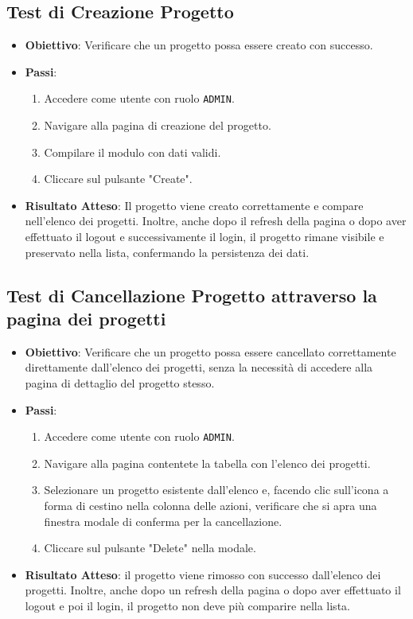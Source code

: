\documentclass[target=bach,aauheader=,style=]{thud}
\begin{document}
\subsection{Test di Creazione Progetto}
\begin{itemize}
    \item \textbf{Obiettivo}: Verificare che un progetto possa essere creato con successo.
    \item \textbf{Passi}:
    \begin{enumerate}
        \item Accedere come utente con ruolo \texttt{ADMIN}.
        \item Navigare alla pagina di creazione del progetto.
        \item Compilare il modulo con dati validi.
        \item Cliccare sul pulsante "Create".
    \end{enumerate}
    \item \textbf{Risultato Atteso}: Il progetto viene creato correttamente e compare nell'elenco dei progetti. Inoltre, anche dopo il refresh della pagina o dopo aver effettuato il logout e successivamente il login, il progetto rimane visibile e preservato nella lista, confermando la persistenza dei dati.
\end{itemize}

\subsection{Test di Cancellazione Progetto attraverso la pagina dei progetti}
\begin{itemize}
    \item \textbf{Obiettivo}: Verificare che un progetto possa essere cancellato correttamente direttamente dall'elenco dei progetti, senza la necessità di accedere alla pagina di dettaglio del progetto stesso.
    \item \textbf{Passi}:
    \begin{enumerate}
        \item Accedere come utente con ruolo \texttt{ADMIN}.
        \item Navigare alla pagina contentete la tabella con l'elenco dei progetti.
        \item Selezionare un progetto esistente dall'elenco e, facendo clic sull'icona a forma di cestino nella colonna delle azioni, verificare che si apra una finestra modale di conferma per la cancellazione.
        \item Cliccare sul pulsante "Delete" nella modale.
    \end{enumerate}
    \item \textbf{Risultato Atteso}: il progetto viene rimosso con successo dall'elenco dei progetti. Inoltre, anche dopo un refresh della pagina o dopo aver effettuato il logout e poi il login, il progetto non deve più comparire nella lista.
\end{itemize}
\end{document}
